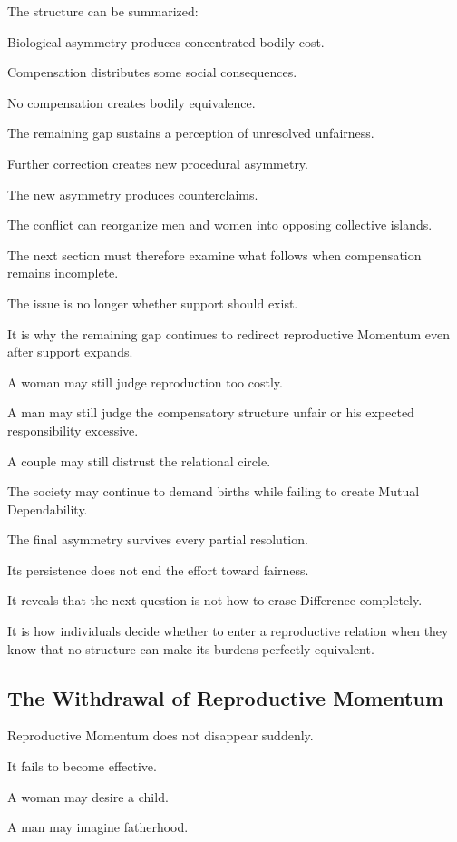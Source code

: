 The structure can be summarized:

Biological asymmetry produces concentrated bodily cost.

Compensation distributes some social consequences.

No compensation creates bodily equivalence.

The remaining gap sustains a perception of unresolved unfairness.

Further correction creates new procedural asymmetry.

The new asymmetry produces counterclaims.

The conflict can reorganize men and women into opposing collective islands.

The next section must therefore examine what follows when compensation remains incomplete.

The issue is no longer whether support should exist.

It is why the remaining gap continues to redirect reproductive Momentum even after support expands.

A woman may still judge reproduction too costly.

A man may still judge the compensatory structure unfair or his expected responsibility excessive.

A couple may still distrust the relational circle.

The society may continue to demand births while failing to create Mutual Dependability.

The final asymmetry survives every partial resolution.

Its persistence does not end the effort toward fairness.

It reveals that the next question is not how to erase Difference completely.

It is how individuals decide whether to enter a reproductive relation when they know that no structure can make its burdens perfectly equivalent.

\subsection*{\textbf{The Withdrawal of Reproductive Momentum}}


Reproductive Momentum does not disappear suddenly.

It fails to become effective.

A woman may desire a child.

A man may imagine fatherhood.

